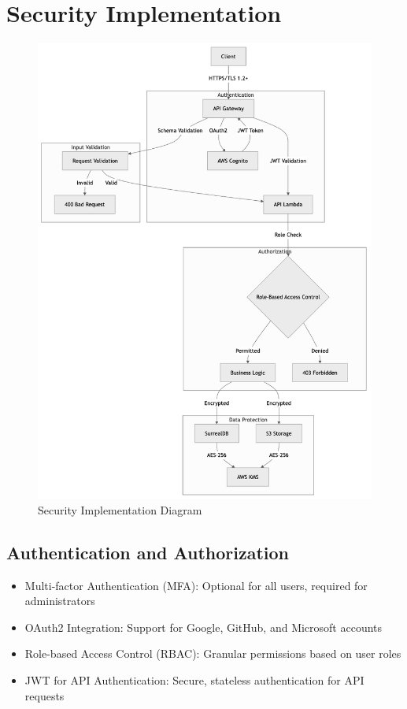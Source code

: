 \documentclass[a4paper, 11pt]{scrreprt}
\begin{document}
\section{Security Implementation}
\begin{figure}[ht]
    \centering
    \includegraphics[height=0.6\textheight]{security_implementation.png}
    \caption{Security Implementation Diagram}
\end{figure}

\subsection{Authentication and Authorization}
\begin{itemize}
    \item Multi-factor Authentication (MFA): Optional for all users, required for administrators
    \item OAuth2 Integration: Support for Google, GitHub, and Microsoft accounts
    \item Role-based Access Control (RBAC): Granular permissions based on user roles
    \item JWT for API Authentication: Secure, stateless authentication for API requests
\end{itemize}
\end{document}
